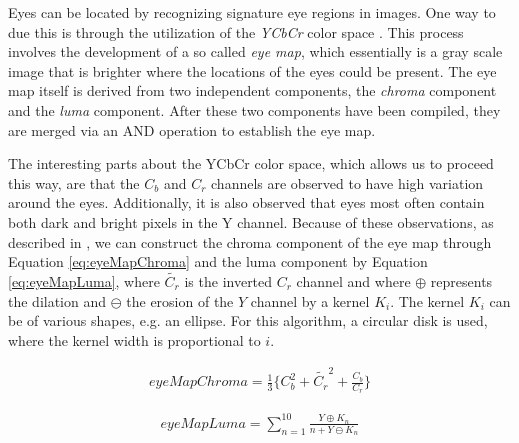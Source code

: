 Eyes can be located by recognizing signature eye regions in images. One way to due this is through the utilization of the \textit{YCbCr} color space \cite{fdInColorImages}. This process involves the development of a so called \textit{eye map}, which essentially is a gray scale image that is brighter where the locations of the eyes could be present. The eye map itself is derived from two independent components, the \textit{chroma} component and the \textit{luma} component. After these two components have been compiled, they are merged via an AND operation to establish the eye map. 

The interesting parts about the YCbCr color space, which allows us to proceed this way, are that the $C_{b}$ and $C_{r}$ channels are observed to have high variation around the eyes. Additionally, it is also observed that eyes most often contain both dark and bright pixels in the Y channel. Because of these observations, as described in \cite{fdInColorImages}, we can construct  the chroma component of the eye map through Equation \ref{eq:eyeMapChroma} and the luma component by Equation \ref{eq:eyeMapLuma}, where $\tilde{C_r}$ is the inverted $C_r$ channel and where $\oplus$ represents the dilation and $\ominus$ the erosion of the $Y$ channel by a kernel $K_{i}$. The kernel $K_{i}$ can be of various shapes, e.g. an ellipse. For this algorithm, a circular disk is used, where the kernel width is proportional to $i$.

\begin{equation} \label{eq:eyeMapChroma}
\begin{split}
eyeMapChroma = \frac{1}{3} \lbrace C_b^2 + \tilde{C_r}^2 + \frac{C_b}{C_r} \rbrace
\end{split}
\end{equation}


\begin{equation} \label{eq:eyeMapLuma}
\begin{split}
  eyeMapLuma = \sum_{n=1}^{10}\frac{Y\oplus K_{n}}{n + Y\ominus  K_{n}}
\end{split}
\end{equation}








